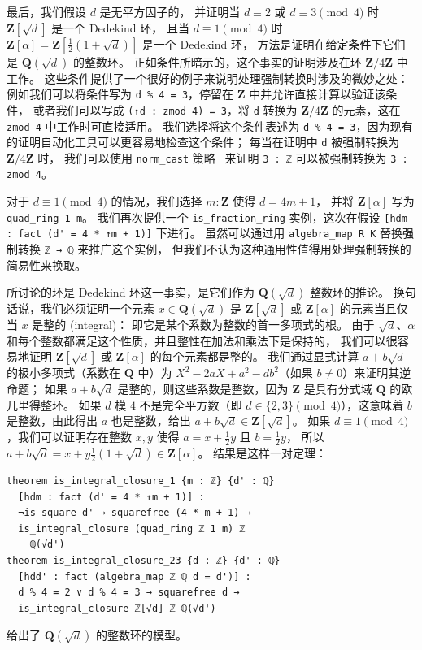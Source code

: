 \documentclass[sigplan,10pt,nonacm,
screen]{acmart} \settopmatter{printfolios=true,printccs=false,printacmref=false}
\newcommand{\QQ}{\mathbf{Q}}
\newcommand{\ZZ}{\mathbf{Z}}
\begin{document}
    最后，我们假设 $d$ 是无平方因子的，
    并证明当 $d \equiv 2$ 或 $d \equiv 3 \pmod 4$ 时 $\ZZ[\sqrt{d}]$ 是一个 Dedekind 环，
    且当 $d \equiv 1 \pmod 4$ 时 $\ZZ[\alpha] = \ZZ[\frac{1}{2}(1 + \sqrt{d})]$ 是一个 Dedekind 环，
    方法是证明在给定条件下它们是 $\QQ(\sqrt d)$ 的整数环。
    正如条件所暗示的，这个事实的证明涉及在环 $\ZZ / 4\ZZ$ 中工作。
    这些条件提供了一个很好的例子来说明处理强制转换时涉及的微妙之处：
    例如我们可以将条件写为 \lstinline{d % 4 = 3}，停留在 $\ZZ$ 中并允许直接计算以验证该条件，
    或者我们可以写成 \lstinline{(↑d : zmod 4) = 3}，将 \lstinline{d} 转换为 $\ZZ / 4\ZZ$ 的元素，这在 \lstinline{zmod 4} 中工作时可直接适用。
我们选择将这个条件表述为 \lstinline{d % 4 = 3}，因为现有的证明自动化工具可以更容易地检查这个条件；
每当在证明中 \lstinline{d} 被强制转换为 $\ZZ / 4\ZZ$ 时，
我们可以使用 \lstinline{norm_cast} 策略~\cite{norm_cast} 来证明 \lstinline{3 : ℤ} 可以被强制转换为 \lstinline{3 : zmod 4}。

    对于 $d \equiv 1 \pmod 4$ 的情况，我们选择 $m : \ZZ$ 使得 $d = 4m + 1$，
    并将 $\ZZ[\alpha]$ 写为 \lstinline{quad_ring 1 m}。
    我们再次提供一个 \lstinline{is_fraction_ring} 实例，这次在假设 \lstinline{[hdm : fact (d' = 4 * ↑m + 1)]} 下进行。
虽然可以通过用 \lstinline{algebra_map R K} 替换强制转换 \lstinline{ℤ → ℚ} 来推广这个实例，
    但我们不认为这种通用性值得用处理强制转换的简易性来换取。

    所讨论的环是 Dedekind 环这一事实，是它们作为 $\QQ(\sqrt{d})$ 整数环的推论。
    换句话说，我们必须证明一个元素 $x \in \QQ(\sqrt{d})$ 是 $\ZZ[\sqrt{d}]$ 或 $\ZZ[\alpha]$ 的元素当且仅当 $x$ 是整的 (integral)：
    即它是某个系数为整数的首一多项式的根。
    由于 $\sqrt{d}$、$\alpha$ 和每个整数都满足这个性质，并且整性在加法和乘法下是保持的，
    我们可以很容易地证明 $\ZZ[\sqrt{d}]$ 或 $\ZZ[\alpha]$ 的每个元素都是整的。
    我们通过显式计算 $a + b \sqrt{d}$ 的极小多项式（系数在 $\QQ$ 中）为 $X^2 - 2aX + a^2 - d b^2$（如果 $b \ne 0$）来证明其逆命题；
    如果 $a + b \sqrt{d}$ 是整的，则这些系数是整数，因为 $\ZZ$ 是具有分式域 $\QQ$ 的欧几里得整环。
    如果 $d$ 模 $4$ 不是完全平方数（即 $d \in \{2, 3\} \pmod 4$），这意味着 $b$ 是整数，由此得出 $a$ 也是整数，给出 $a + b \sqrt{d} \in \ZZ[\sqrt{d}]$。
    如果 $d \equiv 1 \pmod 4$，我们可以证明存在整数 $x, y$ 使得 $a = x + \frac{1}{2}y$ 且 $b = \frac{1}{2}y$，
    所以 $a + b \sqrt{d} = x + y\frac{1}{2}(1 + \sqrt{d}) \in \ZZ[\alpha]$。
    结果是这样一对定理：
\begin{lstlisting}
theorem is_integral_closure_1 {m : ℤ} {d' : ℚ}
  [hdm : fact (d' = 4 * ↑m + 1)] :
  ¬is_square d' → squarefree (4 * m + 1) →
  is_integral_closure (quad_ring ℤ 1 m) ℤ
    ℚ(√d')
theorem is_integral_closure_23 {d : ℤ} {d' : ℚ}
  [hdd' : fact (algebra_map ℤ ℚ d = d')] :
  d % 4 = 2 ∨ d % 4 = 3 → squarefree d →
  is_integral_closure ℤ[√d] ℤ ℚ(√d')
\end{lstlisting}
给出了 $\QQ(\sqrt d)$ 的整数环的模型。
\end{document}
